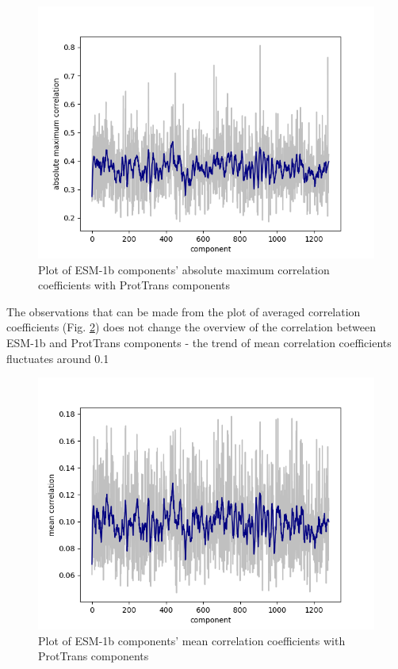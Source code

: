 \documentclass[12pt]{article}
\begin{document}
	\begin{figure}[h!]
		\centering
		\includegraphics[scale=0.85]{validation_small_set_2_joined_correlation_max.png}

		\caption{Plot of ESM-1b components' absolute maximum correlation coefficients 
		with ProtTrans components}
		\label{figure:correlationComponentsMax}
	\end{figure}

	\newpage

	The observations that can be made from the plot of averaged correlation 
	coefficients (Fig. \ref{figure:correlationComponentsMean}) does not change the overview of the correlation between 
	ESM-1b and ProtTrans components - the trend of mean correlation coefficients 
	fluctuates around 0.1

	\begin{figure}[h!]
		\centering
		\includegraphics[scale=0.85]{validation_small_set_2_joined_correlation_mean.png}

		\caption{Plot of ESM-1b components' mean correlation coefficients 
		with ProtTrans components}
		\label{figure:correlationComponentsMean}
	\end{figure}
\end{document}
